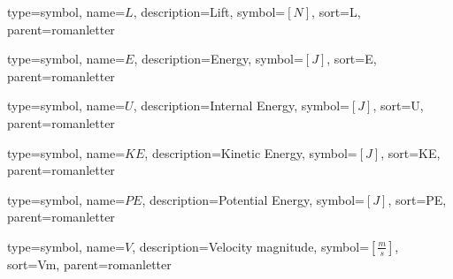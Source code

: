 {
type=symbol, %
name={\ensuremath{L}}, %
description={Lift}, %
symbol={$\left[N\right]$}, %
sort=L, %
parent=romanletter %
}

{
type=symbol, %
name={\ensuremath{E}}, %
description={Energy}, %
symbol={$\left[J\right]$}, %
sort=E, %
parent=romanletter %
}

{
type=symbol, %
name={\ensuremath{U}}, %
description={Internal Energy}, %
symbol={$\left[J\right]$}, %
sort=U, %
parent=romanletter %
}

{
type=symbol, %
name={\ensuremath{KE}}, %
description={Kinetic Energy}, %
symbol={$\left[J\right]$}, %
sort=KE, %
parent=romanletter %
}

{
type=symbol, %
name={\ensuremath{PE}}, %
description={Potential Energy}, %
symbol={$\left[J\right]$}, %
sort=PE, %
parent=romanletter %
}

{
type=symbol, %
name={\ensuremath{V}}, %
description={Velocity magnitude}, %
symbol={$\left[\frac{m}{s}\right]$}, %
sort=Vm, %
parent=romanletter %
}

